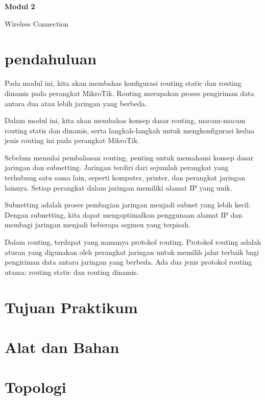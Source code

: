 \newpage
\setcounter{section}{0}
\renewcommand{\thesection}{\arabic{section}}

\begin{center}
    \Huge
    \textbf{Modul 2}
    
    Wireless Connection

\end{center}


\section{pendahuluan}

Pada modul ini, kita akan membahas konfigurasi routing static dan routing dinamis pada perangkat
MikroTik. Routing merupakan proses pengiriman data antara dua atau lebih jaringan yang berbeda.

Dalam modul ini, kita akan membahas konsep dasar routing, macam-macam routing statis dan
dinamis, serta langkah-langkah untuk mengkonfigurasi kedua jenis routing ini pada perangkat
MikroTik.

Sebelum memulai pembahasan routing, penting untuk memahami konsep dasar jaringan dan
subnetting. Jaringan terdiri dari sejumlah perangkat yang terhubung satu sama lain, seperti komputer,
printer, dan perangkat jaringan lainnya. Setiap perangkat dalam jaringan memiliki alamat IP yang
unik.

Subnetting adalah proses pembagian jaringan menjadi subnet yang lebih kecil. Dengan subnetting, kita
dapat mengoptimalkan penggunaan alamat IP dan membagi jaringan menjadi beberapa segmen yang
terpisah.

Dalam routing, terdapat yang namanya protokol routing. Protokol routing adalah aturan yang
digunakan oleh perangkat jaringan untuk memilih jalur terbaik bagi pengiriman data antara jaringan
yang berbeda. Ada dua jenis protokol routing utama: routing static dan routing dinamis.

\section{Tujuan Praktikum}


\section{Alat dan Bahan}


\section{Topologi}

